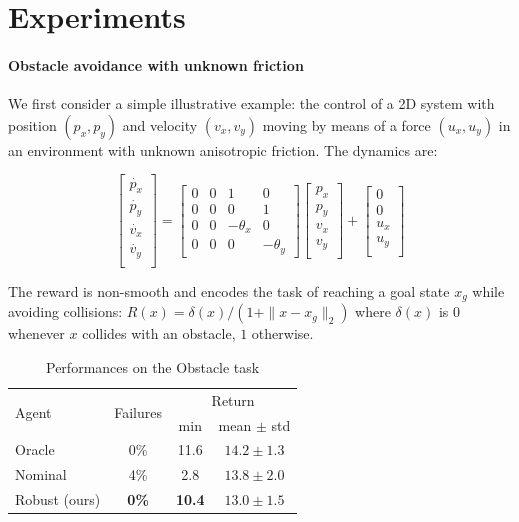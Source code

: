 \documentclass{article}
\begin{document}
\section{Experiments}

\paragraph{Obstacle avoidance with unknown friction}
We first consider a simple illustrative example: the control of a 2D system with position $(p_x,p_y)$ and velocity $(v_x, v_y)$ moving by means of a force $(u_x, u_y)$ in an environment with unknown anisotropic friction. The dynamics are:

\begin{equation*}
\begin{bmatrix}
\dot{p_x}\\
\dot{p_y}\\
\dot{v_x}\\
\dot{v_y}\\
\end{bmatrix} = 
\begin{bmatrix}
0 & 0 & 1 & 0 \\
0 & 0 & 0 & 1 \\
0 & 0 & -\theta_x & 0 \\
0 & 0 & 0 & -\theta_y
\end{bmatrix}
\begin{bmatrix}
{p_x}\\
{p_y}\\
{v_x}\\
{v_y}\\
\end{bmatrix}
+
\begin{bmatrix}
0\\
0\\
{u_x}\\
{u_y}\\
\end{bmatrix}
\end{equation*}

The reward is non-smooth and encodes the task of reaching a goal state $x_g$ while avoiding collisions: $R(x) = \delta(x)/(1 + \|x - x_g\|_2)$  where $\delta(x)$ is $0$ whenever $x$ collides with an obstacle, $1$ otherwise.

\begin{table}[htbp]
	\caption{Performances on the Obstacle task}
	\label{tab:obstacle}
	\centering
	\begin{tabular}{lccc}
		\toprule
		\multirow{2}{*}{Agent} &
		\multirow{2}{*}{Failures} &
		\multicolumn{2}{c}{Return} \\
		\cmidrule{3-4} & & min &
		mean $\pm$ std \\
		\midrule
		Oracle & 0\% & {11.6} & {$14.2 \pm 1.3$} \\
		\midrule
		{Nominal} & {4\%} & {2.8} & \textbf{$\mathbf{13.8} \pm 2.0$} \\
		Robust (ours) & \textbf{0\%} & \textbf{10.4} & {$13.0 \pm 1.5$} \\
		\bottomrule
	\end{tabular}
\end{table}
 
\end{document}
